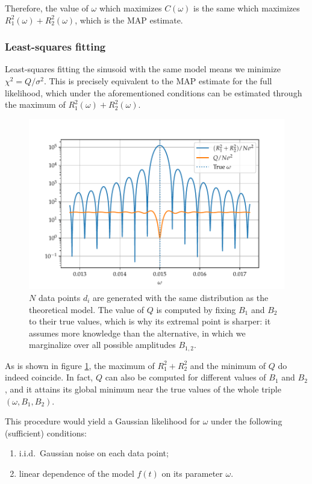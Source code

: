 \documentclass[main.tex]{subfiles}
\begin{document}
Therefore, the value of \(\omega \) which maximizes \(C(\omega )\) is the same which maximizes \(R_1^2 (\omega ) + R_2^2 (\omega )\), which is the MAP estimate. 

\subsubsection{Least-squares fitting}

Least-squares fitting the sinusoid with the same model means we minimize \(\chi^2 =  Q / \sigma^2\).
This is precisely equivalent to the MAP estimate for the full likelihood, which under the aforementioned conditions can be estimated through the maximum of \(R_1^2(\omega ) + R_2^2(\omega )\). 

\begin{figure}[ht]
\centering
\includegraphics[width=\textwidth]{figures/chisquare_omega.pdf}
\caption{\(N\) data points \(d_i\) are generated with the same distribution as the theoretical model. The value of \(Q\) is computed by fixing \(B_1 \) and \(B_2 \) to their true values, which is why its extremal point is sharper: it assumes more knowledge than the alternative, in which we marginalize over all possible amplitudes \(B_{1, 2}\).}
\label{fig:chisquare_omega}
\end{figure}

As is shown in figure \ref{fig:chisquare_omega}, the maximum of \(R_1^2 + R_2^2\) and the minimum of \(Q\) do indeed coincide. In fact, \(Q\) can also be computed for different values of \(B_1 \) and \(B_2 \), and it attains its global minimum near the true values of the whole triple \((\omega , B_1 , B_2 )\).

This procedure would yield a Gaussian likelihood for \(\omega \) under the following (sufficient) conditions: 
\begin{enumerate}
    \item i.i.d.\ Gaussian noise on each data point;
    \item linear dependence of the model \(f(t)\) on its parameter \(\omega \).
\end{enumerate}
\end{document}

